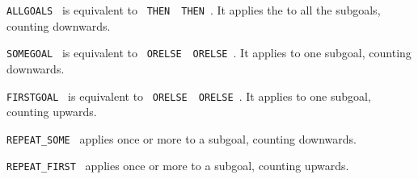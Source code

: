 \begin{isabellebody}
\begin{isamarkuptext}
  \begin{description}

  \item \verb|ALLGOALS|~ is equivalent to ~\verb|THEN|~~\verb|THEN|~.  It
  applies the  to all the subgoals, counting downwards.

  \item \verb|SOMEGOAL|~ is equivalent to ~\verb|ORELSE|~~\verb|ORELSE|~.  It
  applies  to one subgoal, counting downwards.

  \item \verb|FIRSTGOAL|~ is equivalent to ~\verb|ORELSE|~~\verb|ORELSE|~.  It
  applies  to one subgoal, counting upwards.

  \item \verb|REPEAT_SOME|~ applies  once or
  more to a subgoal, counting downwards.

  \item \verb|REPEAT_FIRST|~ applies  once or
  more to a subgoal, counting upwards.

  \end{description}%
\end{isamarkuptext}%
\isamarkuptrue%
%
\endisatagmlref
{\isafoldmlref}%
%
\isadelimmlref
%
\endisadelimmlref
%
\isadelimtheory
%
\endisadelimtheory
%
\isatagtheory
{}\isamarkupfalse%
%
\endisatagtheory
{\isafoldtheory}%
%
\isadelimtheory
%
\endisadelimtheory
\isanewline
\end{isabellebody}%
